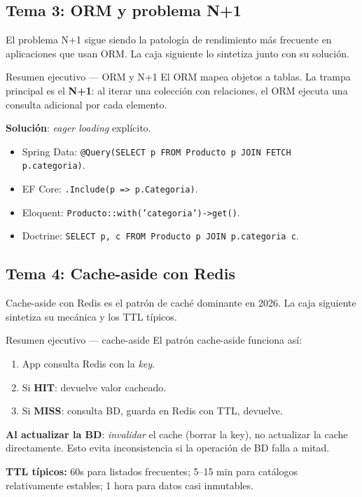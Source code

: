 \documentclass[11pt,a4paper,openany]{book}
\begin{document}
\subsection{Tema 3: ORM y problema N+1}

El problema N+1 sigue siendo la patología de rendimiento
más frecuente en aplicaciones que usan ORM. La caja siguiente lo
sintetiza junto con su solución.


\begin{cajadefinicion}{Resumen ejecutivo --- ORM y N+1}
El ORM mapea objetos a tablas. La trampa principal es el \textbf{N+1}:
al iterar una colección con relaciones, el ORM ejecuta una consulta
adicional por cada elemento.

\textbf{Solución}: \emph{eager loading} explícito.
\begin{itemize}
\item Spring Data: \texttt{@Query(SELECT p FROM Producto p JOIN
FETCH p.categoria)}.
\item EF Core: \texttt{.Include(p => p.Categoria)}.
\item Eloquent: \texttt{Producto::with('categoria')->get()}.
\item Doctrine: \texttt{SELECT p, c FROM Producto p JOIN p.categoria c}.
\end{itemize}
\end{cajadefinicion}

\subsection{Tema 4: Cache-aside con Redis}

Cache-aside con Redis es el patrón de caché dominante en
2026. La caja siguiente sintetiza su mecánica y los TTL típicos.


\begin{cajadefinicion}{Resumen ejecutivo --- cache-aside}
El patrón cache-aside funciona así:

\begin{enumerate}
\item App consulta Redis con la \emph{key}.
\item Si \textbf{HIT}: devuelve valor cacheado.
\item Si \textbf{MISS}: consulta BD, guarda en Redis con TTL,
devuelve.
\end{enumerate}

\textbf{Al actualizar la BD}: \emph{invalidar} el cache (borrar la
key), no actualizar la cache directamente. Esto evita inconsistencia
si la operación de BD falla a mitad.

\textbf{TTL típicos:} 60s para listados frecuentes; 5--15 min para
catálogos relativamente estables; 1 hora para datos casi inmutables.
\end{cajadefinicion}
\end{document}
